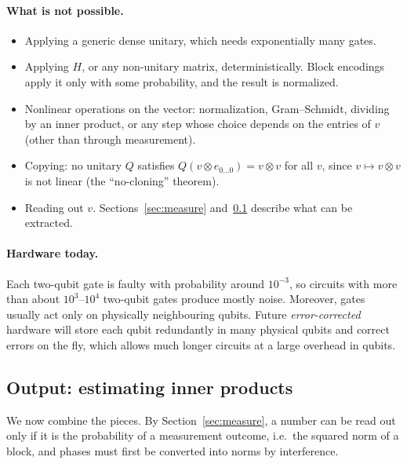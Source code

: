 \documentclass[11pt,a4paper]{article}
\begin{document}
\paragraph{What is not possible.}
\begin{itemize}
\item Applying a generic dense unitary, which needs exponentially many gates.
\item Applying $H$, or any non-unitary matrix, deterministically. Block
  encodings apply it only with some probability, and the result is
  normalized.
\item Nonlinear operations on the vector: normalization, Gram--Schmidt,
  dividing by an inner product, or any step whose choice depends on the
  entries of $v$ (other than through measurement).
\item Copying: no unitary $Q$ satisfies $Q(v\otimes e_{0\dots0})=v\otimes v$
  for all $v$, since $v\mapsto v\otimes v$ is not linear (the
  ``no-cloning'' theorem).
\item Reading out $v$. Sections~\ref{sec:measure} and~\ref{sec:output} describe what can be
  extracted.
\end{itemize}

\paragraph{Hardware today.} Each two-qubit gate is faulty with probability
around $10^{-3}$, so circuits with more than about $10^3$--$10^4$
two-qubit gates produce mostly noise. Moreover, gates usually act only on
physically neighbouring qubits. Future \emph{error-corrected} hardware
will store each qubit redundantly in many physical qubits and correct
errors on the fly, which allows much longer circuits at a large overhead
in qubits.

\subsection{Output: estimating inner products}\label{sec:output}

We now combine the pieces. By Section~\ref{sec:measure}, a number can be
read out only if it is the probability of a measurement outcome, i.e.\
the squared norm of a block, and phases must first be converted into
norms by interference.
\end{document}
